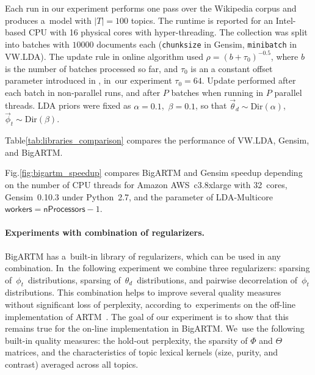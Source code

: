 \documentclass[russian]{llncs}
\newcommand{\kw}[1]{\textsf{#1}}
\begin{document}
Each run in our experiment performs one pass over the Wikipedia corpus and produces a~model with $|T|=100$ topics.
The runtime is reported for an Intel-based CPU with 16 physical cores with hyper-threading.
The collection was split into batches with $10 000$ documents each
(\texttt{chunksize} in Gensim, \texttt{minibatch} in VW.LDA).
The update rule in online algorithm used
${\rho = (b + \tau_0)^{-0.5}}$,
where $b$ is the number of batches processed so far,
and $\tau_0$ is an a constant offset parameter introduced in \cite{hoffman10online},
in~our experiment ${\tau_0 = 64}$.
Update performed after each batch in non-parallel runs, and after $P$ batches when running in $P$ parallel threads.
LDA priors were fixed as
${\alpha = 0.1}$,\, ${\beta = 0.1}$,
so that
$\vec{\theta}_d \sim \text{Dir}(\alpha)$,\,
$\vec{\phi}_t \sim \text{Dir}(\beta)$.

Table\;\ref{tab:libraries_comparison} compares the performance of VW.LDA, Gensim, and BigARTM.

Fig.\;\ref{fig:bigartm_speedup} compares BigARTM and Gensim speedup depending on the number of CPU threads
for Amazon AWS~c3.8xlarge with 32~cores,
Gensim~\mbox{0.10.3} under Python~\mbox{2.7},
and the parameter of LDA-Multicore $\kw{workers}=\kw{nProcessors}-1$.


\paragraph{Experiments with combination of regularizers.}

BigARTM has a~built-in library of regularizers, which can be used in any combination.
In~the following experiment we combine three regularizers:
sparsing of~$\phi_{t}$~distributions,
sparsing of~$\theta_{d}$~distributions, and
pairwise decorrelation of~$\phi_{t}$ distributions.
This combination helps to improve several quality measures without significant loss of perplexity,
according to~experiments on the off-line implementation of ARTM~\cite{voron14aist}.
The goal of our experiment is to show that this remains true
for the on-line implementation in BigARTM.
We~use the following built-in quality measures:
the hold-out perplexity,
the sparsity of $\Phi$ and $\Theta$ matrices, and
the characteristics of topic lexical kernels (size, purity, and contrast) averaged across all topics.
\end{document}
